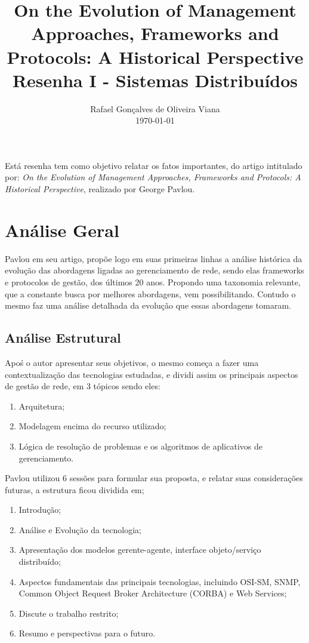 \documentclass[12pt]{article}
\title{On the Evolution of Management Approaches,
		Frameworks and Protocols: A Historical Perspective\\ Resenha I - Sistemas Distribuídos}
\author{Rafael Gonçalves de Oliveira Viana\inst{1} \\\vspace*{10pt} \normalsize  \today{} }
\begin{document}
 

\maketitle

     
\begin{resumo} 	
  Está resenha tem como objetivo relatar os fatos importantes, do artigo intitulado por: \textit{On the Evolution of Management Approaches,
  Frameworks and Protocols: A Historical Perspective}, realizado por George Pavlou.
\end{resumo}



\section{Análise Geral}
 Pavlou em seu artigo, propõe logo em suas primeiras linhas a análise histórica da evolução das abordagens ligadas ao gerenciamento de rede, sendo elas frameworks e protocolos de gestão, dos últimos 20 anos. Propondo uma taxonomia relevante, que a constante busca por melhores abordagens, vem possibilitando. Contudo o mesmo faz uma análise detalhada da evolução que essas abordagens tomaram.
\subsection{Análise Estrutural}
 Apoś o autor apresentar seus objetivos, o mesmo começa a fazer uma contextualização das tecnologias estudadas, e dividi assim os principais aspectos de gestão de rede, em 3 tópicos sendo eles:

	 \begin{enumerate}
	 	\item Arquitetura;
	 	\item Modelagem encima do recurso utilizado;
	 	\item Lógica de resolução de problemas e os algoritmos de aplicativos de gerenciamento.
	 \end{enumerate}
 
	Pavlou utilizou 6 sessões para formular sua proposta, e relatar suas considerações futuras, a estrutura ficou dividida em; 
  \begin{enumerate}
  	\item Introdução;
  	\item Análise e Evolução da tecnologia;
  	\item Apresentação dos modelos gerente-agente, interface objeto/serviço distribuído;
  	\item Aspectos fundamentais das principais tecnologias, incluindo OSI-SM, SNMP, Common Object Request Broker Architecture (CORBA) e Web Services;
  	\item Discute o trabalho restrito;
  	\item Resumo e perspectivas para o futuro. 	
 	
 \end{enumerate}
\end{document}
